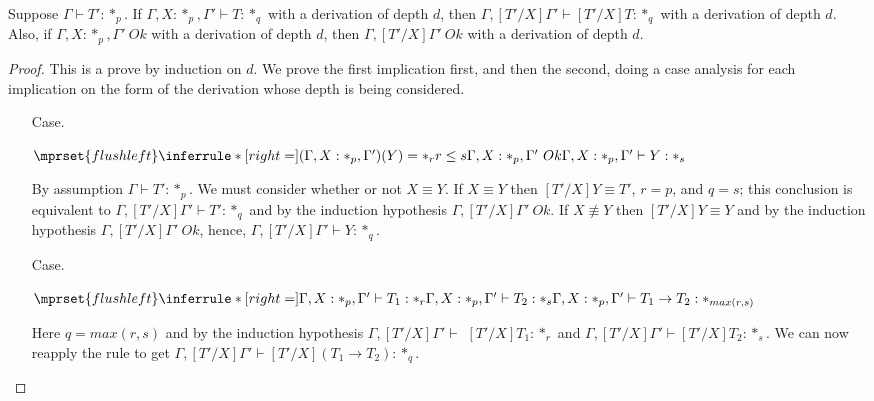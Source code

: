 \begin{lemma}
  Suppose $\Gamma \vdash T':*_p$.  If $\Gamma,X:*_p,\Gamma' \vdash T:*_q$ 
  with a derivation of depth $d$, then $\Gamma,[T'/X]\Gamma' \vdash [T'/X]T:*_q$
  with a derivation of depth $d$.
  Also, if $\Gamma,X:*_p,\Gamma'\ Ok$ with a derivation of depth $d$, then 
  $\Gamma,[T'/X]\Gamma'\ Ok$ with a derivation of depth $d$.
  \label{lemma:substitution_for_kinding_ssf}
\end{lemma}
\begin{proof}
  This is a prove by induction on $d$.  We prove the first implication first, and then the 
  second, doing a case analysis for each implication on the form of the derivation whose depth 
  is being considered. 

  \begin{itemize}
  \item[Case.]\ \\
    \begin{center}
      \begin{math}
        $$\mprset{flushleft}
        \inferrule* [right=] {
          (\Gamma,X:*_p,\Gamma')(Y) = *_r
          \\
          r \leq s
          \\
          \Gamma,X:*_p,\Gamma'\ Ok
        }{\Gamma,X:*_p,\Gamma' \vdash Y : *_s}
      \end{math}
    \end{center}
    By assumption $\Gamma \vdash T':*_p$.  We must consider whether or not 
    $X \equiv Y$.  If $X \equiv Y$ then $[T'/X]Y \equiv T'$, $r = p$, and $q = s$; 
    this conclusion is equivalent to $\Gamma,[T'/X]\Gamma' \vdash T':*_q$ and
    by the induction hypothesis $\Gamma,[T'/X]\Gamma'\ Ok$.  
    If $X \not \equiv Y$ then $[T'/X]Y \equiv Y$ and 
    by the induction hypothesis $\Gamma,[T'/X]\Gamma'\ Ok$, hence,
    $\Gamma,[T'/X]\Gamma' \vdash Y:*_q$.\\
    
  \item[Case.]\ \\
    \begin{center}
      \begin{math}
        $$\mprset{flushleft}
        \inferrule* [right=] {
          \Gamma,X:*_p,\Gamma' \vdash T_1 : *_r
          \\
          \Gamma,X:*_p,\Gamma' \vdash T_2 : *_s
        }{\Gamma,X:*_p,\Gamma' \vdash T_1 \rightarrow T_2 : *_{max(r,s)}}
      \end{math}
    \end{center}
    Here $q = max(r,s)$ and by the induction hypothesis $\Gamma,[T'/X]\Gamma' \vdash $
    $[T'/X]T_1:*_r$ and $\Gamma,[T'/X]\Gamma' \vdash [T'/X]T_2:*_s$.
    We can now reapply the rule to get 
    $\Gamma,[T'/X]\Gamma' \vdash [T'/X](T_1 \rightarrow T_2) : *_q$.\\
    

\end{itemize}
\end{proof}
